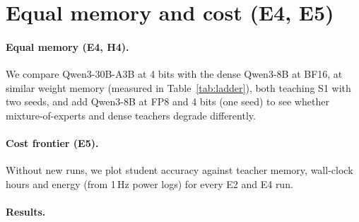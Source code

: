 \section{Equal memory and cost (E4, E5)}\label{sec:memory}

\paragraph{Equal memory (E4, H4).} We compare Qwen3-30B-A3B at 4 bits with the dense Qwen3-8B
at BF16, at similar weight memory (measured in Table~\ref{tab:ladder}), both teaching S1 with
two seeds, and add Qwen3-8B at FP8 and 4 bits (one seed) to see whether mixture-of-experts and
dense teachers degrade differently.


\paragraph{Cost frontier (E5).} Without new runs, we plot student accuracy against teacher
memory, wall-clock hours and energy (from 1\,Hz power logs) for every E2 and E4 run.
\TBD{} 

\paragraph{Results.} \TBD{}
